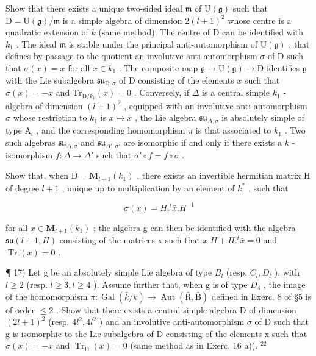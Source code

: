 Show that there exists a unique two-sided ideal \(\mathfrak{m}\) of \(\mathrm{U}(\mathfrak{g})\) such that \(\mathrm{D} = \mathrm{U}(\mathfrak{g}) / \mathfrak{m}\) is a simple algebra of dimension \(2(l + 1)^2\) whose centre is a quadratic extension of \(k\) (same method). The centre of D can be identified with \(k_{1}\) . The ideal \(\mathfrak{m}\) is stable under the principal anti-automorphism of \(\mathrm{U}(\mathfrak{g})\) ; that defines by passage to the quotient an involutive anti-automorphism \(\sigma\) of D such that \(\sigma(x) = \bar{x}\) for all \(x \in k_{1}\) . The composite map \(\mathfrak{g} \to \mathrm{U}(\mathfrak{g}) \to \mathrm{D}\) identifies \(\mathfrak{g}\) with the Lie subalgebra \(\mathfrak{s}\mathfrak{u}_{\mathrm{D},\sigma}\) of D consisting of the elements \(x\) such that \(\sigma(x) = -x\) and \(\mathrm{Tr}_{\mathrm{D}/k_1}(x) = 0\) . Conversely, if \(\Delta\) is a central simple \(k_{1}\) -algebra of dimension \((l + 1)^2\) , equipped with an involutive anti-automorphism \(\sigma\) whose restriction to \(k_{1}\) is \(x \mapsto \bar{x}\) , the Lie algebra \(\mathfrak{s}\mathfrak{u}_{\Delta,\sigma}\) is absolutely simple of type \(\mathrm{A}_l\) , and the corresponding homomorphism \(\pi\) is that associated to \(k_{1}\) . Two such algebras \(\mathfrak{s}\mathfrak{u}_{\Delta,\sigma}\) and \(\mathfrak{s}\mathfrak{u}_{\Delta',\sigma'}\) are isomorphic if and only if there exists a \(k\) -isomorphism \(f: \Delta \to \Delta'\) such that \(\sigma' \circ f = f \circ \sigma\) .

Show that, when \(\mathrm{D} = \mathbf{M}_{l+1}(k_{1})\) , there exists an invertible hermitian matrix H of degree \(l + 1\) , unique up to multiplication by an element of \(k^{*}\) , such that

\[
\sigma (x) = H. ^ {t} \bar {x}. H ^ {- 1}
\]

for all \(x \in \mathbf{M}_{l+1}(k_1)\) ; the algebra g can then be identified with the algebra \(\mathfrak{su}(l + 1, H)\) consisting of the matrices x such that \(x.H + H.^t\bar{x} = 0\) and \(\operatorname{Tr}(x) = 0\) .

¶ 17) Let g be an absolutely simple Lie algebra of type \(B_{l}\) (resp. \(C_{l}, D_{l}\) ), with \(l \geq 2\) (resp. \(l \geq 3, l \geq 4\) ). Assume further that, when g is of type \(D_{4}\) , the image of the homomorphism \(\pi : \operatorname{Gal}(\bar{k}/k) \to \operatorname{Aut}(\bar{\mathrm{R}}, \bar{\mathrm{B}})\) defined in Exerc. 8 of §5 is of order \(\leq 2\) . Show that there exists a central simple algebra D of dimension \((2l + 1)^{2}\) (resp. \(4l^{2}, 4l^{2}\) ) and an involutive anti-automorphism \(\sigma\) of D such that g is isomorphic to the Lie subalgebra of D consisting of the elements x such that \(\sigma(x) = -x\) and \(\operatorname{Tr}_{\mathrm{D}}(x) = 0\) (same method as in Exerc. 16 a)). \(^{22}\)

